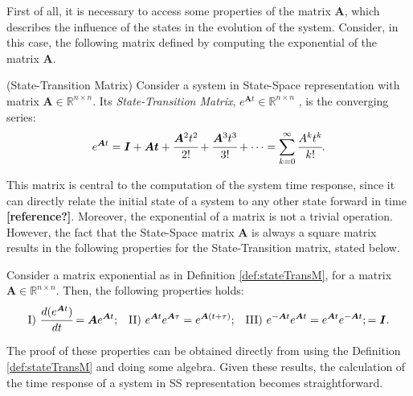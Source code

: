 \documentclass[a4paper,11pt]{book}
\numberwithin{figure}{chapter}
\numberwithin{equation}{chapter}
\numberwithin{table}{chapter}
\newtheorem{theorem}{Theorem}[chapter]
\theoremstyle{definition}
\newtheorem{definition}{Definition}[chapter]
\newcounter{boxed-theorem}
\newenvironment{boxed-theorem}[1]
{\colorlet{shadecolor}{pastelBlue2!10} \begin{shaded} \begin{theorem}{#1}}
{\end{theorem} \end{shaded}}
\newcounter{boxed-definition}
\newenvironment{boxed-definition}[1]
{\colorlet{shadecolor}{pastelYellow!15} \begin{shaded} \begin{definition}{#1}}
{\end{definition} \end{shaded}}
\newcounter{boxed-example}
\begin{document}
First of all, it is necessary to access some properties of the matrix $\bm{A}$, which describes the influence of the states in the evolution of the system. Consider, in this case, the following matrix defined by computing the exponential of the matrix $\bm{A}$. 	

\begin{boxed-definition}{(State-Transition Matrix)} \label{def:stateTransM}
    Consider a system in State-Space representation with matrix $\bm{A} \in \mathbb{R}^{n \times n}$. Its \textit{State-Transition Matrix}, $e^{\bm{A} t} \in \mathbb{R}^{n \times n}$ , is the converging series:
\begin{equation}
    e^{\bm{A} t} = \bm{I} + \bm{At} + \cfrac{\bm{A}^2 t^2}{2!} + \cfrac{\bm{A}^3 t^3}{3!} + \cdots = \sum_{k=0}^{\infty} \cfrac{A^k t^k}{k!}
.\end{equation} 
\end{boxed-definition}

This matrix is central to the computation of the system time response, since it can directly relate the initial state of a system to any other state forward in time \textbf{[reference?]}. Moreover, the exponential of a matrix is not a trivial operation. However, the fact that the State-Space matrix $\bm{A}$ is always a square matrix results in the following properties for the State-Transition matrix, stated below.

\begin{boxed-theorem}{} \label{th:stateTransMProp}
    Consider a matrix exponential as in Definition \ref{def:stateTransM}, for a matrix $\bm{A}  \in \mathbb{R}^{n \times n}$. Then, the following properties holds:
\begin{align}
        {\rm I})\ \cfrac{d ( e^{\bm{A} t} )}{dt} = \bm{A} e^{\bm{A} t}; & &
        {\rm II})\ e^{\bm{A} t} e^{\bm{A} \tau} = e^{\bm{A} (t + \tau)}; & &
        {\rm III})\ e^{-\bm{A} t} e^{\bm{A} t} = e^{\bm{A} t} e^{-\bm{A} t}; = \bm{I}
.\end{align}
\end{boxed-theorem}

The proof of these properties can be obtained directly from using the Definition \ref{def:stateTransM} and doing some algebra. Given these results, the calculation of the time response of a system in SS representation becomes straightforward.
\end{document}
